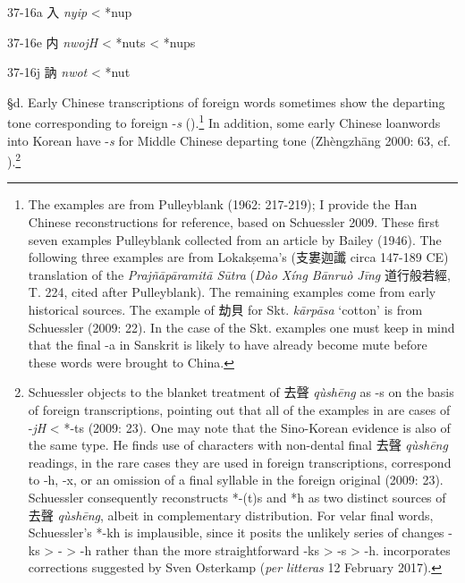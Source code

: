 \begin{description} \item
37-16a 入  \emph{nyip} \textless{} *nup
\end{description}

\begin{description} \item
37-16e 内  \emph{nwojH} \textless{} *n{}uts \textless{} *n{}ups
\end{description}

\begin{description} \item
37-16j 訥 \emph{nwot} \textless{} *n{}ut
\end{description}

§d. Early Chinese transcriptions of foreign words sometimes show the
departing tone cor­re­spond­ing to foreign -\emph{s} ().\footnote{The
  examples are from Pulleyblank (1962: 217-219); I provide the Han
  Chinese reconstructions for reference, based on Schuessler 2009. These
  first seven examples Pulleyblank collected from an article by Bailey
  (1946). The following three examples are from Lokakṣema's (支婁迦讖
  circa 147-189 CE) translation of the \emph{Prajñāpāramitā Sūtra}
  (\emph{Dào Xíng Bānruò Jīng} 道行般若經, T. 224, cited after
  Pulleyblank). The remaining examples come from early historical
  sources. The example of 劫貝 for Skt.  \emph{kārpāsa} `cotton' is from
  Schuessler (2009: 22). In the case of the Skt. examples one must keep
  in mind that the final -a in Sanskrit is likely to have already become
  mute before these words were brought to China. } In addition, some
early Chinese loanwords into Korean have -\emph{s} for Middle Chinese
departing tone (Zhèngzhāng 2000: 63, cf. ).\footnote{Schuessler objects
  to the blanket treatment of 去聲  \emph{qùshēng} as -s on the basis of
  foreign transcriptions, pointing out that all of the examples in are
  cases of -\emph{jH} \textless{} *-ts (2009: 23). One may note that the
  Sino-Korean evidence is also of the same type. He finds use of
  characters with non-dental final 去聲  \emph{qùshēng} readings, in the
  rare cases they are used in foreign transcriptions, correspond to -h,
  -x, or an omission of a final syllable in the foreign original (2009:
  23). Schuessler consequently reconstructs *-(t)s and *h as two
  distinct sources of 去聲 \emph{qùshēng}, albeit in complementary
  distribution. For velar final words, Schuessler's *-kh is implausible,
  since it posits the unlikely series of changes -ks \textgreater{} -{}
  \textgreater{} -h rather than the more straightforward -ks
  \textgreater{} -s \textgreater{} -h. incorporates corrections
  suggested by Sven Osterkamp (\emph{per litteras} 12 February 2017).}

